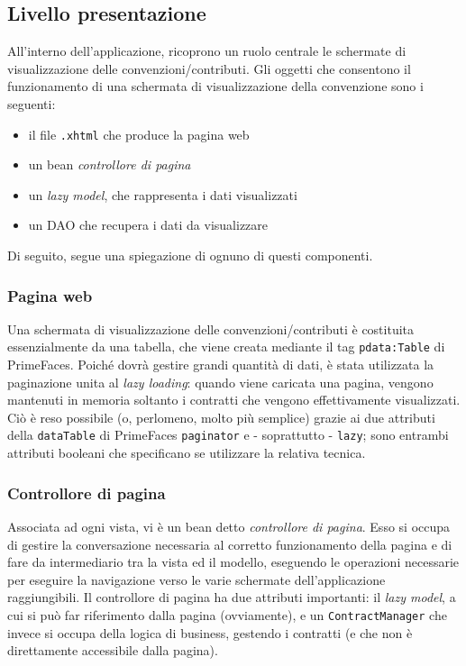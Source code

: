 \subsection{Livello presentazione}

All'interno dell'applicazione, ricoprono un ruolo centrale le schermate di visualizzazione delle convenzioni/contributi. Gli oggetti che consentono il funzionamento di una schermata di visualizzazione della convenzione sono i seguenti:

\begin{itemize}
\item il file \texttt{.xhtml} che produce la pagina web
\item un bean \textsl{controllore di pagina}
\item un \textit{lazy model}, che rappresenta i dati visualizzati
\item un DAO che recupera i dati da visualizzare
\end{itemize}

Di seguito, segue una spiegazione di ognuno di questi componenti.

\subsubsection{Pagina web}
Una schermata di visualizzazione delle convenzioni/contributi è costituita essenzialmente da una tabella, che viene creata mediante il tag \lstinline{pdata:Table} di PrimeFaces. Poiché dovrà gestire grandi quantità di dati, è stata utilizzata la paginazione unita al \textit{lazy loading}: quando viene caricata una pagina, vengono mantenuti in memoria soltanto i contratti che vengono effettivamente visualizzati. Ciò è reso possibile (o, perlomeno, molto più semplice) grazie ai due attributi della \texttt{dataTable} di PrimeFaces \texttt{paginator} e - soprattutto - \texttt{lazy}; sono entrambi attributi booleani che specificano se utilizzare la relativa tecnica.

\subsubsection{Controllore di pagina}
Associata ad ogni vista, vi è un bean detto \textsl{controllore di pagina}. Esso si occupa di gestire la conversazione necessaria al corretto funzionamento della pagina e di fare da intermediario tra la vista ed il modello, eseguendo le operazioni necessarie per eseguire la navigazione verso le varie schermate dell'applicazione raggiungibili. Il controllore di pagina ha due attributi importanti: il \textit{lazy model}, a cui si può far riferimento dalla pagina (ovviamente), e un \lstinline{ContractManager} che invece si occupa della logica di business, gestendo i contratti (e che non è direttamente accessibile dalla pagina).


